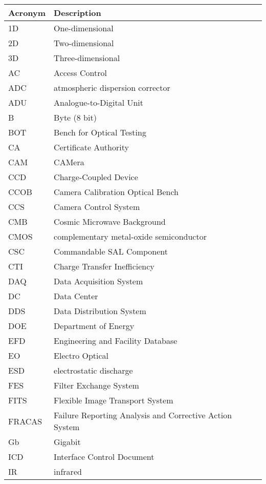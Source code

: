 \addtocounter{table}{-1}
\begin{longtable}{p{}p{}}\hline
\textbf{Acronym} & \textbf{Description}  \\\hline

1D & One-dimensional \\\hline
2D & Two-dimensional \\\hline
3D & Three-dimensional \\\hline
AC & Access Control \\\hline
ADC & atmospheric dispersion corrector \\\hline
ADU & Analogue-to-Digital Unit \\\hline
B & Byte (8 bit) \\\hline
BOT & Bench for Optical Testing \\\hline
CA & Certificate Authority \\\hline
CAM & CAMera \\\hline
CCD & Charge-Coupled Device \\\hline
CCOB & Camera Calibration Optical Bench \\\hline
CCS & Camera Control System \\\hline
CMB & Cosmic Microwave Background \\\hline
CMOS & complementary metal-oxide semiconductor \\\hline
CSC & Commandable SAL Component \\\hline
CTI & Charge Transfer Inefficiency \\\hline
DAQ & Data Acquisition System \\\hline
DC & Data Center \\\hline
DDS & Data Distribution System \\\hline
DOE & Department of Energy \\\hline
EFD & Engineering and Facility Database \\\hline
EO & Electro Optical \\\hline
ESD & electrostatic discharge \\\hline
FES & Filter Exchange System \\\hline
FITS & Flexible Image Transport System \\\hline
FRACAS & Failure Reporting Analysis and Corrective Action System \\\hline
Gb & Gigabit \\\hline
ICD & Interface Control Document \\\hline
IR & infrared \\\hline

\end{longtable}
